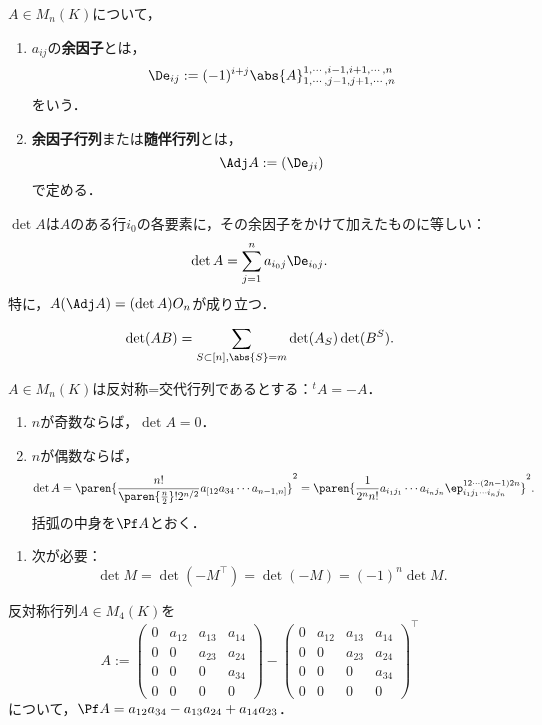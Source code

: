 \documentclass[uplatex, dvipdfmx]{jsreport}
\begin{document}
\begin{definition}
    $A\in M_n(K)$について，
    \begin{enumerate}
        \item $a_{ij}$の\textbf{余因子}とは，
        \[\De_{ij}:=(-1)^{i+j}\abs{A}^{1,\cdots,i-1,i+1,\cdots,n}_{1,\cdots,j-1,j+1,\cdots, n}\]
        をいう．
        \item \textbf{余因子行列}または\textbf{随伴行列}とは，
        \[\Adj A:=(\De_{ji})\]
        で定める．
    \end{enumerate}
\end{definition}

\begin{proposition}
    $\det A$は$A$のある行$i_0$の各要素に，その余因子をかけて加えたものに等しい：
    \[\det A=\sum_{j=1}^na_{i_0j}\De_{i_0j}.\]
    特に，$A(\Adj A)=(\det A)O_n$が成り立つ．
\end{proposition}

\begin{proposition}
    \[\det(AB)=\sum_{S\subset[n],\abs{S}=m}\det(A_S)\det(B^S).\]
\end{proposition}

\begin{proposition}[Pfaffian]
    $A\in M_n(K)$は反対称=交代行列であるとする：${}^t\!A=-A$．
    \begin{enumerate}
        \item $n$が奇数ならば，$\det A=0$．
        \item $n$が偶数ならば，
        \[\det A=\paren{\frac{n!}{\paren{\frac{n}{2}}!2^{n/2}}a_{[12}a_{34}\cdots a_{n-1,n]}}^2=\paren{\frac{1}{2^nn!}a_{i_1j_1}\cdots a_{i_nj_n}\ep^{12\cdots (2n-1)2n}_{i_1j_1\cdots i_nj_n}}^2.\]
        括弧の中身を$\Pf A$とおく．
    \end{enumerate}
\end{proposition}
\begin{Proof}\mbox{}
    \begin{enumerate}
        \item 次が必要：
        \[\det M=\det(-M^\top)=\det(-M)=(-1)^n\det M.\]
    \end{enumerate}
\end{Proof}
\begin{example}
    反対称行列$A\in M_4(K)$を
    \[A:=\begin{pmatrix}0&a_{12}&a_{13}&a_{14}\\0&0&a_{23}&a_{24}\\0&0&0&a_{34}\\0&0&0&0\end{pmatrix}-\begin{pmatrix}0&a_{12}&a_{13}&a_{14}\\0&0&a_{23}&a_{24}\\0&0&0&a_{34}\\0&0&0&0\end{pmatrix}^\top\]
    について，$\Pf A=a_{12}a_{34}-a_{13}a_{24}+a_{14}a_{23}$．
\end{example}
\end{document}
